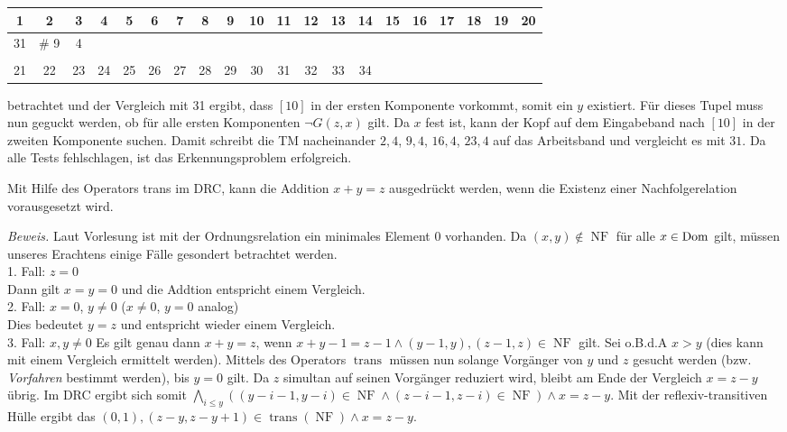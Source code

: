\documentclass[12pt,a4paper]{amsart}
\DeclareMathOperator{\NF}{NF}
\DeclareMathOperator{\trans}{trans}
\begin{document}
\begin{aufgabe1}
{\tiny
\begin{center}
\begin{tabular}{cccccccccccccccccccc}
1 & 2 & 3 & 4 & 5 & 6 & 7 & 8 & 9 & 10 & 11 & 12 & 13 & 14 & 15 & 16 & 17 & 18 & 19 & 20\\ \hline
31 & \# 9 & 4 \\ \hline \hline \\ 
21 & 22 & 23 & 24 & 25 & 26 & 27 & 28 & 29 & 30 & 31 & 32 & 33 & 34 \\ \hline
\end{tabular}
\end{center}
}
betrachtet und der Vergleich mit 31 ergibt, dass $[10]$ in der ersten Komponente vorkommt, somit ein $y$ existiert.
Für dieses Tupel muss nun geguckt werden, ob für alle ersten Komponenten $\lnot G(z,x)$ gilt. Da $x$ fest ist, kann der Kopf auf dem Eingabeband nach $[10]$ in der zweiten Komponente suchen. Damit schreibt die TM nacheinander $2,4$, $9,4$, $16,4$, $23,4$ auf das Arbeitsband und vergleicht es mit $31$. Da alle Tests fehlschlagen, ist das Erkennungsproblem erfolgreich.
\end{aufgabe1}


\begin{aufgabe1}
Mit Hilfe des Operators trans im DRC, kann die Addition $x+y=z$ ausgedrückt werden, wenn die Existenz einer Nachfolgerelation vorausgesetzt wird.
\end{aufgabe1}

{\em Beweis.}
Laut Vorlesung ist mit der Ordnungsrelation ein minimales Element $0$ vorhanden. Da $(x,y)\not\in\NF$ für alle $x\in\operatorname{Dom}$ gilt, müssen unseres Erachtens einige Fälle gesondert betrachtet werden.\\
1. Fall: $z=0$\\
Dann gilt $x=y=0$ und die Addtion entspricht einem Vergleich.\\
2. Fall: $x=0$, $y\neq 0$ ($x\neq 0$, $y=0$ analog)\\
Dies bedeutet $y=z$ und entspricht wieder einem Vergleich.\\
3. Fall: $x,y\neq 0$
Es gilt genau dann $x+y=z$, wenn $x+y-1=z-1 \land (y-1,y),(z-1,z)\in\NF$ gilt. Sei o.B.d.A $x>y$ (dies kann mit einem Vergleich ermittelt werden). Mittels des Operators $\trans$
müssen nun solange Vorgänger von $y$ und $z$ gesucht werden (bzw. {\em Vorfahren} bestimmt werden), bis $y=0$ gilt. Da $z$ simultan auf seinen Vorgänger reduziert wird, bleibt am Ende der Vergleich $x=z-y$ übrig. Im DRC ergibt sich somit $\bigwedge_{i\leq y} ( (y-i-1,y-i)\in\NF \land (z-i-1,z-i)\in\NF )\land x=z-y$. Mit der reflexiv-transitiven Hülle ergibt das $(0,1),(z-y,z-y+1)\in\trans(\NF)\land x=z-y$.
\end{document}
